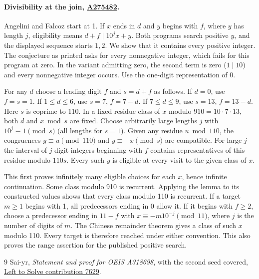 \documentclass[11pt]{article}
\newcommand{\seqref}[1]{\href{https://oeis.org/#1}{#1}}
\begin{document}
\paragraph{Divisibility at the join, \seqref{A275482}.} Angelini and Falcoz start at 1. If $x$ ends in $d$ and $y$ begins with $f$, where $y$ has length $j$, eligibility means $d+f\mid10^jx+y$. Both programs search positive $y$, and the displayed sequence starts $1,2$. We show that it contains every positive integer. The conjecture as printed asks for every nonnegative integer, which fails for this program at zero. In the variant admitting zero, the second term is zero ($1\mid10$) and every nonnegative integer occurs. Use the one-digit representation of 0.

For any $d$ choose a leading digit $f$ and $s=d+f$ as follows. If $d=0$, use $f=s=1$. If $1\le d\le6$, use $s=7$, $f=7-d$. If $7\le d\le9$, use $s=13$, $f=13-d$. Here $s$ is coprime to 110. In a fixed residue class of $x$ modulo $910=10\cdot7\cdot13$, both $d$ and $x\bmod s$ are fixed. Choose arbitrarily large lengths $j$ with $10^j\equiv1\pmod s$ (all lengths for $s=1$). Given any residue $u\bmod110$, the congruences $y\equiv u\pmod{110}$ and $y\equiv-x\pmod s$ are compatible. For large $j$ the interval of $j$-digit integers beginning with $f$ contains representatives of this residue modulo $110s$. Every such $y$ is eligible at every visit to the given class of $x$.

This first proves infinitely many eligible choices for each $x$, hence infinite continuation. Some class modulo 910 is recurrent. Applying the lemma to its constructed values shows that every class modulo 110 is recurrent. If a target $m\ge1$ begins with 1, all predecessors ending in 0 allow it. If it begins with $f\ge2$, choose a predecessor ending in $11-f$ with $x\equiv-m10^{-j}\pmod{11}$, where $j$ is the number of digits of $m$. The Chinese remainder theorem gives a class of such $x$ modulo 110. Every target is therefore reached under either convention. This also proves the range assertion for the published positive search.
\begin{thebibliography}{9}
 Sai-yr, \emph{Statement and proof for OEIS A318698}, with the second seed covered, \href{https://github.com/GuillaumeBAUD-coder/open-math-agents/pull/7629}{Left to Solve contribution 7629}.
\end{thebibliography}
\end{document}
